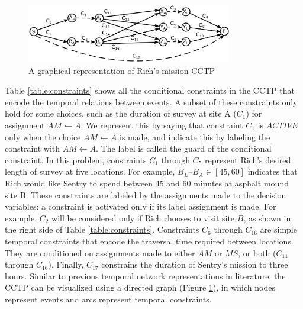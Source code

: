 \documentclass[jair,twoside,11pt,theapa]{article}
\begin{document}
\begin{figure}[h!]
	\centering
	\includegraphics[width=0.80\textwidth]{figures/example_cctp.pdf}  
	\caption{A graphical representation of Rich's mission CCTP}
	\label{fig:example_cctp}
\end{figure}


%
%


Table \ref{table:constraints} shows all the conditional constraints in the CCTP
that encode the temporal relations between events. A subset of these constraints only hold for some choices, such as the duration of survey at site A ($C_1$) for assignment $AM\leftarrow A$. We represent this by saying that constraint $C_1$ is $\mathit{ACTIVE}$ only when the choice $AM\leftarrow A$ is made, and indicate this by labeling the constraint with $AM\leftarrow A$.  The label is called the guard of the conditional constraint. In this problem, constraints $C_1$ through
$C_5$ represent Rich's desired length of survey at
five locations. For example, $B_L$--$B_A\in [45,60]$ indicates that Rich would like
Sentry to spend between 45 and 60 minutes at asphalt mound site B. These constraints are labeled
by the assignments made to the decision variables: a constraint is activated
only if its label assignment is made. For example, $C_2$ will be considered only
if Rich chooses to visit site $B$, as shown in the right side of Table
\ref{table:constraints}. Constraints $C_6$ through $C_{16}$ are simple temporal
constraints that encode the traversal time required between locations. They are
conditioned on assignments made to either $AM$ or $MS$, or both ($C_{11}$
through $C_{16}$). Finally, $C_{17}$ constrains the duration of Sentry's mission
to three hours. Similar to previous temporal network representations in
literature, the CCTP can be visualized using a directed graph (Figure
\ref{fig:example_cctp}), in which nodes represent events and arcs represent temporal constraints.
\end{document}
